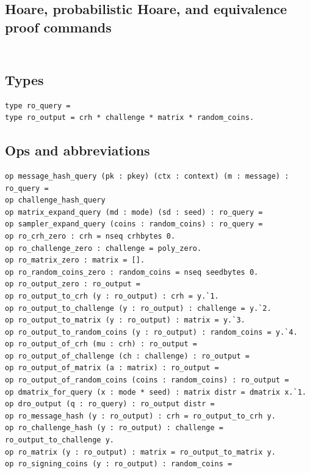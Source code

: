 \subsection*{Hoare, probabilistic Hoare, and equivalence proof commands}
\begin{lstlisting}[language=EasyCrypt,basicstyle=\ttfamily\tiny]
\end{lstlisting}

\section*{}

\subsection*{Types}
\begin{lstlisting}[language=EasyCrypt,basicstyle=\ttfamily\tiny]
type ro_query =
type ro_output = crh * challenge * matrix * random_coins.
\end{lstlisting}

\subsection*{Ops and abbreviations}
\begin{lstlisting}[language=EasyCrypt,basicstyle=\ttfamily\tiny]
op message_hash_query (pk : pkey) (ctx : context) (m : message) : ro_query =
op challenge_hash_query
op matrix_expand_query (md : mode) (sd : seed) : ro_query =
op sampler_expand_query (coins : random_coins) : ro_query =
op ro_crh_zero : crh = nseq crhbytes 0.
op ro_challenge_zero : challenge = poly_zero.
op ro_matrix_zero : matrix = [].
op ro_random_coins_zero : random_coins = nseq seedbytes 0.
op ro_output_zero : ro_output =
op ro_output_to_crh (y : ro_output) : crh = y.`1.
op ro_output_to_challenge (y : ro_output) : challenge = y.`2.
op ro_output_to_matrix (y : ro_output) : matrix = y.`3.
op ro_output_to_random_coins (y : ro_output) : random_coins = y.`4.
op ro_output_of_crh (mu : crh) : ro_output =
op ro_output_of_challenge (ch : challenge) : ro_output =
op ro_output_of_matrix (a : matrix) : ro_output =
op ro_output_of_random_coins (coins : random_coins) : ro_output =
op dmatrix_for_query (x : mode * seed) : matrix distr = dmatrix x.`1.
op dro_output (q : ro_query) : ro_output distr =
op ro_message_hash (y : ro_output) : crh = ro_output_to_crh y.
op ro_challenge_hash (y : ro_output) : challenge = ro_output_to_challenge y.
op ro_matrix (y : ro_output) : matrix = ro_output_to_matrix y.
op ro_signing_coins (y : ro_output) : random_coins =
\end{lstlisting}

